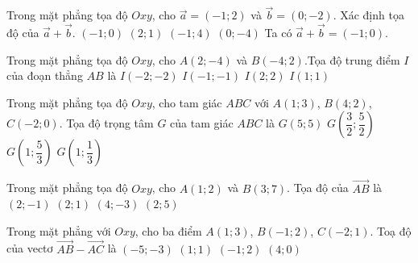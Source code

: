\begin{ex}%
	Trong mặt phẳng tọa độ $Oxy$, cho $\overrightarrow{a}=(-1;2)$ và $\overrightarrow{b}=(0;-2)$. Xác định tọa độ của $\overrightarrow{a}+\overrightarrow{b}$.
	\choice
	{\True $(-1;0)$}
	{$(2;1)$}
	{$(-1;4)$}
	{$(0;-4)$}
	\loigiai
	{
		Ta có $\overrightarrow{a}+\overrightarrow{b}=(-1;0)$.
	}
\end{ex}
\begin{ex}%
	Trong mặt phẳng tọa độ $Oxy$, cho $A(2;-4)$ và $B(-4;2)$.Tọa độ trung điểm $I$ của đoạn thẳng $AB$ là
	\choice
	{$I(-2;-2)$}
	{\True $I(-1;-1)$}
	{$I(2;2)$}
	{$I(1;1)$}
\end{ex}
\begin{ex}%
	Trong mặt phẳng tọa độ $Oxy$, cho  tam giác $ABC$ với $A(1;3)$, $B(4;2)$, $C(-2;0)$. Tọa độ trọng tâm $G$ của tam giác $ABC$ là
	\choice
	{$G(5;5)$}
	{$G\left(\dfrac{3}{2};\dfrac{5}{2} \right)$}
	{\True $G\left(1;\dfrac{5}{3} \right)$}
	{$G\left(1;\dfrac{1}{3} \right)$}
\end{ex}

\begin{ex}%
	Trong mặt phẳng tọa độ $Oxy$, cho $A\left(1;2\right)$ và $B\left(3;7\right)$. Tọa độ của $\overrightarrow{AB}$ là
	\choice
	{$\left(2;-1\right)$}
	{$\left(2;1\right)$}
	{$\left(4;-3\right)$}
	{\True $\left(2;5\right)$}
\end{ex}
\begin{ex}%
	Trong mặt phẳng với $Oxy$, cho ba điểm $A(1;3)$, $B(-1;2)$, $C(-2;1)$. Toạ độ của vectơ $\overrightarrow{AB}-\overrightarrow{AC}$ là
	\choice
	{$(-5;-3)$}
	{\True $(1;1)$}
	{$(-1;2)$}
	{$(4;0)$}
\end{ex}

